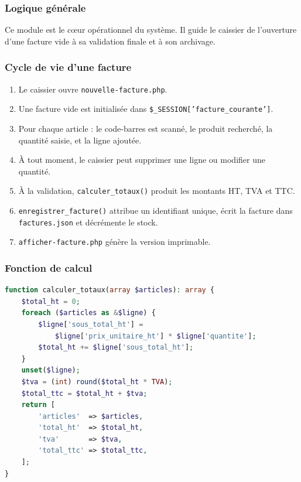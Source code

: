 \documentclass[12pt,a4paper]{article}
\begin{document}
\subsubsection{Logique générale}

Ce module est le c\oe{}ur opérationnel du système. Il guide le caissier de l'ouverture d'une facture vide à sa validation finale et à son archivage.

\subsubsection{Cycle de vie d'une facture}

\begin{enumerate}[leftmargin=1.5em]
    \item Le caissier ouvre \texttt{nouvelle-facture.php}.
    \item Une facture vide est initialisée dans \texttt{\$\_SESSION['facture\_courante']}.
    \item Pour chaque article : le code-barres est scanné, le produit recherché, la quantité saisie, et la ligne ajoutée.
    \item À tout moment, le caissier peut supprimer une ligne ou modifier une quantité.
    \item À la validation, \texttt{calculer\_totaux()} produit les montants HT, TVA et TTC.
    \item \texttt{enregistrer\_facture()} attribue un identifiant unique, écrit la facture dans \texttt{factures.json} et décrémente le stock.
    \item \texttt{afficher-facture.php} génère la version imprimable.
\end{enumerate}

\subsubsection{Fonction de calcul}

\begin{lstlisting}[language=PHP, caption={Calcul des totaux d'une facture}]
function calculer_totaux(array $articles): array {
    $total_ht = 0;
    foreach ($articles as &$ligne) {
        $ligne['sous_total_ht'] =
            $ligne['prix_unitaire_ht'] * $ligne['quantite'];
        $total_ht += $ligne['sous_total_ht'];
    }
    unset($ligne);
    $tva = (int) round($total_ht * TVA);
    $total_ttc = $total_ht + $tva;
    return [
        'articles'  => $articles,
        'total_ht'  => $total_ht,
        'tva'       => $tva,
        'total_ttc' => $total_ttc,
    ];
}
\end{lstlisting}
\end{document}
